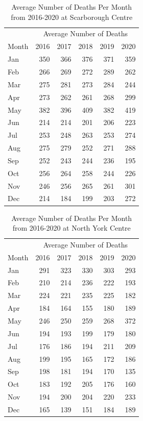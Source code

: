 \documentclass[
  letterpaper,
  DIV=11,
  numbers=noendperiod]{scrartcl}
\begin{document}
\hypertarget{tbl-2}{}
\begin{table}
\caption{\label{tbl-2}Average Number of Deaths Per Month from 2016-2020 at Scarborough Centre }\tabularnewline

\centering
\begin{tabular}{lrrrrr}
\toprule
\multicolumn{1}{c}{ } & \multicolumn{5}{c}{Average Number of Deaths} \\
\cmidrule(l{3pt}r{3pt}){2-6}
Month & 2016 & 2017 & 2018 & 2019 & 2020\\
\midrule
Jan & 350 & 366 & 376 & 371 & 359\\
Feb & 266 & 269 & 272 & 289 & 262\\
Mar & 275 & 281 & 273 & 284 & 244\\
Apr & 273 & 262 & 261 & 268 & 299\\
May & 382 & 396 & 409 & 382 & 419\\
Jun & 214 & 214 & 201 & 206 & 223\\
Jul & 253 & 248 & 263 & 253 & 274\\
Aug & 275 & 279 & 252 & 271 & 288\\
Sep & 252 & 243 & 244 & 236 & 195\\
Oct & 256 & 264 & 258 & 244 & 226\\
Nov & 246 & 256 & 265 & 261 & 301\\
Dec & 214 & 184 & 199 & 203 & 272\\
\bottomrule
\end{tabular}
\end{table}

\hypertarget{tbl-3}{}
\begin{table}
\caption{\label{tbl-3}Average Number of Deaths Per Month from 2016-2020 at North York Centre }\tabularnewline

\centering
\begin{tabular}{lrrrrr}
\toprule
\multicolumn{1}{c}{ } & \multicolumn{5}{c}{Average Number of Deaths} \\
\cmidrule(l{3pt}r{3pt}){2-6}
Month & 2016 & 2017 & 2018 & 2019 & 2020\\
\midrule
Jan & 291 & 323 & 330 & 303 & 293\\
Feb & 210 & 214 & 236 & 222 & 193\\
Mar & 224 & 221 & 235 & 225 & 182\\
Apr & 184 & 164 & 155 & 180 & 189\\
May & 246 & 250 & 259 & 268 & 372\\
Jun & 194 & 193 & 199 & 179 & 180\\
Jul & 176 & 186 & 194 & 211 & 209\\
Aug & 199 & 195 & 165 & 172 & 186\\
Sep & 198 & 181 & 194 & 170 & 135\\
Oct & 183 & 192 & 205 & 176 & 160\\
Nov & 194 & 200 & 204 & 220 & 233\\
Dec & 165 & 139 & 151 & 184 & 189\\
\bottomrule
\end{tabular}
\end{table}
\end{document}
